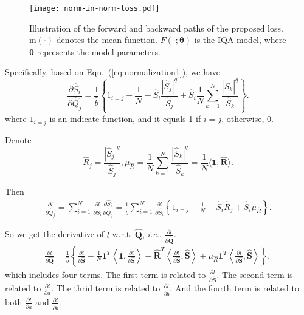 \documentclass[sigconf]{acmart}
\begin{document}
\begin{figure}[!t]
    \centering
    \texttt{[image: norm-in-norm-loss.pdf]}
    \caption{Illustration of the forward and backward paths of the proposed loss. $\mathrm{m}(\cdot)$ denotes the mean function. $F(\cdot; \bm{\theta})$ is the IQA model, where $\bm{\theta}$ represents the model parameters.}
    \label{fig:norm-in-norm loss}
\end{figure}

Specifically, based on Eqn.~(\ref{eq:normalization1}), we have
\begin{equation}\label{eq:grad1}
    \frac{\partial \hat{S}_i}{\partial \hat{Q}_j} = \frac{1}{\hat{b}}\left\{1_{i=j}-\frac{1}{N}-\hat{S}_i\frac{|\hat{S}_j|^q}{\hat{S}_j}+\hat{S}_i\frac{1}{N}\sum_{k=1}^{N}\frac{|\hat{S}_k|^q}{\hat{S}_k}\right\}.
\end{equation}
where $1_{i=j}$ is an indicate function, and it equals 1 if $i=j$, otherwise, 0.

Denote
\begin{equation}\label{eq:rmu}
    \hat{R}_j = \frac{|\hat{S}_j|^q}{\hat{S}_j}, \mu_{\hat{R}} = \frac{1}{N}\sum_{k=1}^{N}\frac{|\hat{S}_k|^q}{\hat{S}_k} = \frac{1}{N}\langle\mathbf{1}, \hat{\mathbf{R}}\rangle.
\end{equation}

Then
\begin{align}\label{eq:grad}
\frac{\partial l}{\partial \hat{Q}_j} = \sum_{i=1}^{N} \frac{\partial l}{\partial \hat{S}_i} \frac{\partial  \hat{S}_i}{\partial \hat{Q}_j} 
= \frac{1}{\hat{b}}\sum_{i=1}^{N} \frac{\partial l}{\partial \hat{S}_i} \left\{1_{i=j}-\frac{1}{N}-\hat{S}_i\hat{R}_j+\hat{S}_i\mu_{\hat{R}}\right\}.
\end{align}


So we get the derivative of $l$ w.r.t. $\hat{\mathbf{Q}}$, \textit{i.e.}, $\frac{\partial l}{\partial \hat{\mathbf{Q}}}$.
\begin{align}
\frac{\partial l}{\partial \hat{\mathbf{Q}}} = \frac{1}{\hat{b}} \left\{\frac{\partial l}{\partial \hat{\mathbf{S}}}-\frac{1}{N}\mathbf{1}^T\left\langle\mathbf{1}, \frac{\partial l}{\partial \hat{\mathbf{S}}}\right\rangle-\hat{\mathbf{R}}^T\left\langle\frac{\partial l}{\partial \hat{\mathbf{S}}},\hat{\mathbf{S}}\right\rangle+\mu_{\hat{R}}\mathbf{1}^T\left\langle\frac{\partial l}{\partial \hat{\mathbf{S}}},\hat{\mathbf{S}}\right\rangle\right\},
\end{align}
which includes four terms. 
The first term is related to $\frac{\partial l}{\partial \hat{\mathbf{S}}}$.
The second term is related to $\frac{\partial l}{\partial \hat{a}}$.
The thrid term is related to $\frac{\partial l}{\partial \hat{b}}$.
And the fourth term is related to both $\frac{\partial l}{\partial \hat{a}}$ and $\frac{\partial l}{\partial \hat{b}}$.
\end{document}
